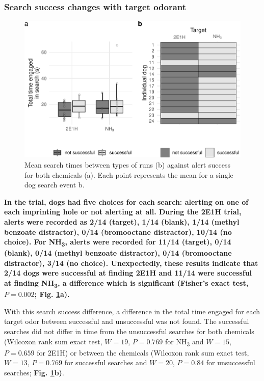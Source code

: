 \documentclass[
]{article}
\begin{document}
\hypertarget{search-success-changes-with-target-odorant}{%
\subsubsection{Search success changes with target odorant}\label{search-success-changes-with-target-odorant}}

\begin{figure}
\centering
\includegraphics{main-manuscript_files/figure-latex/search-times-1.pdf}
\caption{\label{fig:search-times}Mean search times between types of runs (b) against alert success for both chemicals (a). Each point represents the mean for a single dog search event b.}
\end{figure}

\textbf{In the trial, dogs had five choices for each search: alerting on one of each imprinting hole or not alerting at all. During the 2E1H trial, alerts were recorded as 2/14 (target), 1/14 (blank), 1/14 (methyl benzoate distractor), 0/14 (bromooctane distractor), 10/14 (no choice). For NH\textsubscript{3}, alerts were recorded for 11/14 (target), 0/14 (blank), 0/14 (methyl benzoate distractor), 0/14 (bromooctane distractor), 3/14 (no choice). Unexpectedly, these results indicate that 2/14 dogs were successful at finding 2E1H and 11/14 were successful at finding NH\textsubscript{3}, a difference which is significant (Fisher's exact test, \(P = 0.002\); Fig. \ref{fig:search-times}a).}

With this search success difference, a difference in the total time engaged for each target odor between successful and unsuccessful was not found. The successful searches did not differ in time from the unsuccessful searches for both chemicals (Wilcoxon rank sum exact test, \(W = 19\), \(P = 0.769\) for NH\textsubscript{3} and \(W = 15\), \(P = 0.659\) for 2E1H) or between the chemicals (Wilcoxon rank sum exact test, \(W = 13\), \(P = 0.769\) for successful searches and \(W = 20\), \(P = 0.84\) for unsuccessful searches; \textbf{Fig. \ref{fig:search-times}b)}.
\end{document}

